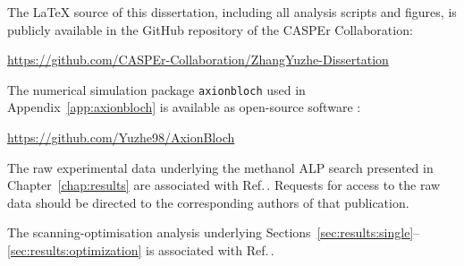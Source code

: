 The \LaTeX{} source of this dissertation, including all analysis scripts and figures, is publicly available in the GitHub repository of the CASPEr Collaboration:
\begin{center}
    \url{https://github.com/CASPEr-Collaboration/ZhangYuzhe-Dissertation}
\end{center}

The numerical simulation package \texttt{axionbloch} used in Appendix~\ref{app:axionbloch} is available as open-source software \cite{Zhang2026_repoAxionBloch}:
\begin{center}
    \url{https://github.com/Yuzhe98/AxionBloch}
\end{center}

The raw experimental data underlying the methanol ALP search presented in Chapter~\ref{chap:results} are associated with Ref.\,\cite{Walter2024_LFthermal}. Requests for access to the raw data should be directed to the corresponding authors of that publication.

The scanning-optimisation analysis underlying Sections~\ref{sec:results:single}--\ref{sec:results:optimization} is associated with Ref.\,\cite{Yuzhe2023_FrequencyScanning}.